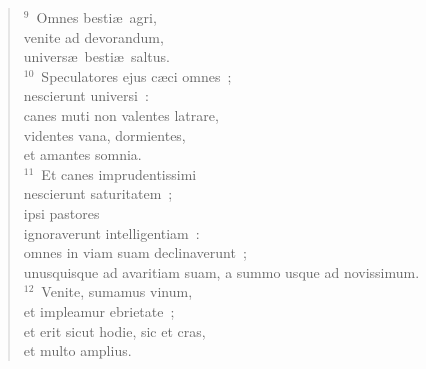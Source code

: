 \begin{verse}${}^{9}$~Omnes besti\ae\ agri,\\ venite ad devorandum,\\ univers\ae\ besti\ae\ saltus.\\
${}^{10}$~Speculatores ejus c\ae ci omnes~;\\ nescierunt universi~:\\ canes muti non valentes latrare,\\ videntes vana, dormientes,\\ et amantes somnia.\\
${}^{11}$~Et canes imprudentissimi\\ nescierunt saturitatem~;\\ ipsi pastores\\ ignoraverunt intelligentiam~:\\ omnes in viam suam declinaverunt~;\\ unusquisque ad avaritiam suam, a summo usque ad novissimum.\\
${}^{12}$~Venite, sumamus vinum,\\ et impleamur ebrietate~;\\ et erit sicut hodie, sic et cras,\\ et multo amplius.\end{verse}


